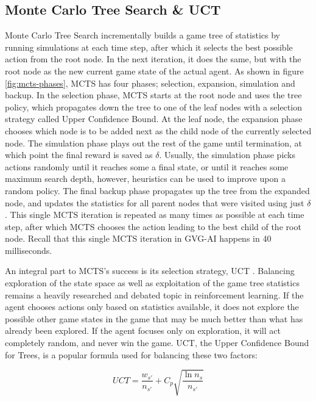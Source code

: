 \documentclass[12pt,a4paper]{article}
\begin{document}
\begin{multicols}{2}
\subsection{Monte Carlo Tree Search \& UCT}
Monte Carlo Tree Search incrementally builds a game tree of statistics by running simulations at each time step, after which it selects the best possible action from the root node. In the next iteration, it does the same, but with the root node as the new current game state of the actual agent. As shown in figure \ref{fig:mcts-phases}, MCTS has four phases; selection, expansion, simulation and backup. In the selection phase, MCTS starts at the root node and uses the tree policy, which propagates down the tree to one of the leaf nodes with a selection strategy called Upper Confidence Bound. At the leaf node, the expansion phase chooses which node is to be added next as the child node of the currently selected node. The simulation phase plays out the rest of the game until termination, at which point the final reward is saved as $\delta$. Usually, the simulation phase picks actions randomly until it reaches some a final state, or until it reaches some maximum search depth, however, heuristics can be used to improve upon a random policy. The final backup phase propagates up the tree from the expanded node, and updates the statistics for all parent nodes that were visited using just $\delta$. This single MCTS iteration is repeated as many times as possible at each time step, after which MCTS chooses the action leading to the best child of the root node. Recall that this single MCTS iteration in GVG-AI happens in 40 milliseconds.

An integral part to MCTS's success is its selection strategy, UCT \cite{Kocsis-Szepesv:2006}.  Balancing exploration of the state space as well as exploitation of the game tree statistics remains a heavily researched and debated topic in reinforcement learning. If the agent chooses actions only based on statistics available, it does not explore the possible other game states in the game that may be much better than what has already been explored. If the agent focuses only on exploration, it will act completely random, and never win the game. UCT, the Upper Confidence Bound for Trees, is a popular formula used for balancing these two factors:

\begin{equation}
	UCT = \frac{w_{s'}}{n_{s'}} + C_p \sqrt{\frac{\ln n_s}{n_{s'}}}
	\label{eq:UCT}
\end{equation}


\end{multicols}
\end{document}
